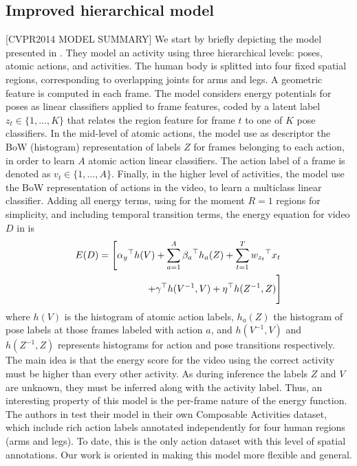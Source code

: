 \subsection{Improved hierarchical model}
[CVPR2014 MODEL SUMMARY] We start by briefly depicting the model presented in \cite{Lillo2014}.
They model an activity using three hierarchical levels: poses, atomic actions, and activities.  The human body is splitted into four fixed spatial regions, corresponding to overlapping joints for arms and legs. A geometric feature is computed in each frame. The model considers energy potentials for poses as linear classifiers applied to frame features, coded by a latent label $z_t \in \{1,\dots,K\}$ that relates the region feature for frame $t$ to one of $K$ pose classifiers. In the mid-level of atomic actions, the model use as descriptor the BoW (histogram) representation of labels $Z$ for frames belonging to each action, in order to learn $A$ atomic action linear classifiers. The action label of a frame is denoted as $v_t \in \{1,\dots,A\}$. Finally, in the higher level of activities, the model use the BoW representation of actions in the video, to learn a multiclass linear classifier. Adding all energy terms, using for the moment $R=1$ regions for simplicity, and including temporal transition terms, the energy equation for video $D$ in \cite{Lillo2014} is 
%
\begin{equation}
\label{eq:energy2014}
\begin{split}
E(D) = \left[ {\alpha_y}^\top h(V) + \sum_{a=1}^A {\beta_a}^\top h_a(Z) + \sum_{t=1}^T {w_{z_t}}^\top x_t \right.\\\left.+ {\gamma}^\top h(V^{-1},V) + {\eta}^\top h(Z^{-1},Z) \vphantom{ \sum_{a=1}^A} \right]
\end{split}
\end{equation}
%
where $h(V)$ is the histogram of atomic action labels, $h_a(Z)$ the histogram of pose labels at those frames labeled with action $a$, and $h(V^{-1},V)$ and $h(Z^{-1},Z)$ represents histograms for action and pose transitions respectively. The main idea is that the energy score for the video using the correct activity must be higher than every other activity. As during inference the labels $Z$ and $V$ are unknown, they must be inferred along with the activity label. Thus, an interesting property of this model is the per-frame nature of the energy function. The authors in \cite{Lillo2014} test their model in their own Composable Activities dataset, which include rich action labels annotated independently for four human regions (arms and legs). To date, this is the only action dataset with this level of spatial annotations. Our work is oriented in making this model more flexible and general.

